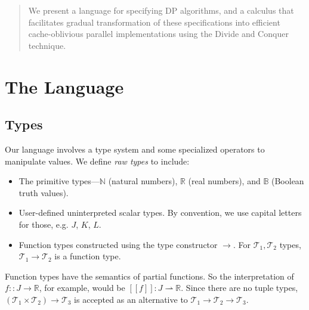 \documentclass{article}
\newcommand\newterm[1]{{\it #1}}
\newcommand\R{\mathbb{R}}
\newcommand\N{\mathbb{N}}
\newcommand\B{\mathbb{B}}
\newcommand\T{\mathcal{T}}
\newcommand\semp[1]{[\![{#1}]\!]}
\newcommand\parto{\rightharpoonup}
\begin{document}
\begin{abstract}
We present a language for specifying DP algorithms, and a calculus that facilitates
gradual transformation of these specifications into efficient cache-oblivious
parallel implementations using the Divide and Conquer technique.
\end{abstract}

\section{The Language}

\subsection{Types}

Our language involves a type system and some specialized operators to manipulate
values. We define \newterm{raw types} to include:
\begin{itemize}
  \item The primitive types---$\N$ (natural numbers), $\R$ (real numbers), and $\B$ (Boolean truth values).
  \item User-defined uninterpreted scalar types. By convention, we use capital letters for those, e.g. $J$, $K$, $L$.
  \item Function types constructed using the type constructor $\to$. For $\T_1, \T_2$ types,
    $\T_1\to\T_2$ is a function type.
\end{itemize}


Function types have the semantics of partial functions. So the interpretation of $f :: J\to\R$, for example, would be
$\semp{f} : J\parto\R$. Since there are no tuple types, $(\T_1\times\T_2)\to\T_3$ is accepted as an alternative to
$\T_1\to\T_2\to\T_3$.
\end{document}
